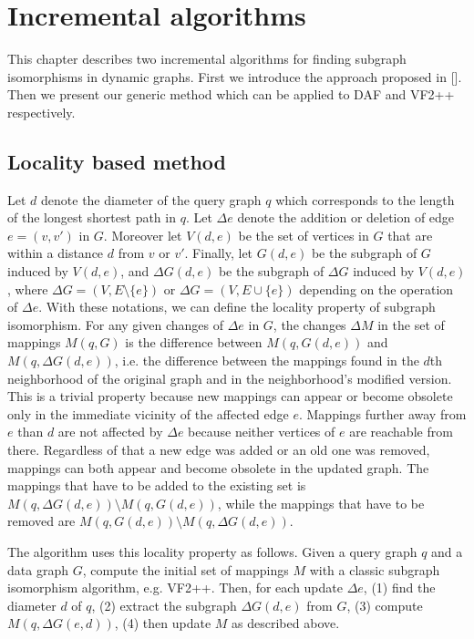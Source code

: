 \chapter{Incremental algorithms}

This chapter describes two incremental algorithms for finding subgraph isomorphisms
in dynamic graphs. First we introduce the approach proposed in []. Then we present
our generic method which can be applied to DAF and VF2++ respectively.



\section{Locality based method}

Let \(d\) denote the diameter of the query graph \(q\) which corresponds to the 
length of the longest shortest path in $q$. Let $\Delta e$ denote the addition or
deletion of edge $e = (v, v')$ in $G$. Moreover let $V(d, e)$ be the set of vertices
in $G$ that are within a distance $d$ from $v$ or $v'$. Finally, let $G(d, e)$
be the subgraph of $G$ induced by $V(d, e)$, and $\Delta G(d, e)$ be the subgraph
of $\Delta G$ induced by $V(d, e)$, where $\Delta G = (V, E \setminus \{e\})$ or
$\Delta G = (V, E \cup \{e\})$ depending on the operation of $\Delta e$. With these
notations, we can define the locality property of subgraph isomorphism. For any 
given changes of $\Delta e$ in $G$, the changes $\Delta M$ in the set of mappings
$M(q, G)$ is the difference between $M(q, G(d, e))$ and $M(q, \Delta G(d, e))$, i.e.
the difference between the mappings found in the $d$th neighborhood of the original graph
and in the neighborhood's modified version. This is a trivial property because new mappings can 
appear or become obsolete only in the immediate vicinity of the affected edge $e$. 
Mappings further away from $e$ than $d$ are not affected by $\Delta e$ because neither 
vertices of $e$ are reachable from there. Regardless of that a new edge was added
or an old one was removed, mappings can both appear and become obsolete in the updated
graph. The mappings that have to be added to the existing set is 
$M(q, \Delta G(d, e)) \setminus M(q, G(d, e))$, while the mappings that have to be
removed are $M(q, G(d, e)) \setminus M(q, \Delta G(d, e))$.

The algorithm uses this locality property as follows. Given a query graph $q$ and a 
data graph $G$, compute the initial set of mappings $M$ with a classic subgraph 
isomorphism algorithm, e.g. VF2++. Then, for each update $\Delta e$, (1) find the 
diameter $d$ of $q$, (2) extract the subgraph $\Delta G(d, e)$ from $G$, (3) compute 
$M(q, \Delta G(e, d))$, (4) then update $M$ as described above.

